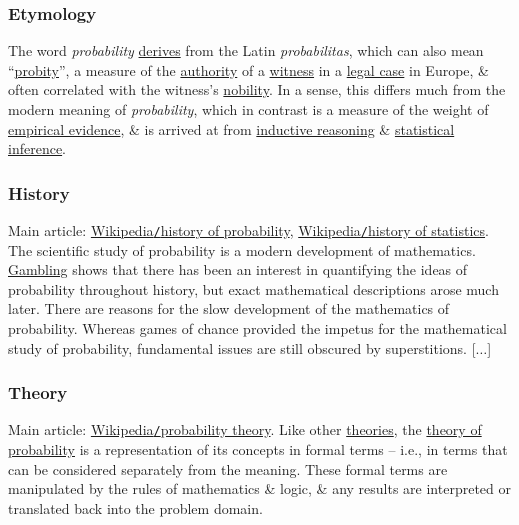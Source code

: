 \documentclass{article}
\begin{document}
\subsubsection{Etymology}
The word {\it probability} \href{https://en.wikipedia.org/wiki/Etymology}{derives} from the Latin {\it probabilitas}, which can also mean ``\href{https://en.wiktionary.org/wiki/probity}{probity}'', a measure of the \href{https://en.wikipedia.org/wiki/Authority}{authority} of a \href{https://en.wikipedia.org/wiki/Witness}{witness} in a \href{https://en.wikipedia.org/wiki/Legal_case}{legal case} in Europe, \& often correlated with the witness's \href{https://en.wikipedia.org/wiki/Nobility}{nobility}. In a sense, this differs much from the modern meaning of {\it probability}, which in contrast is a measure of the weight of \href{https://en.wikipedia.org/wiki/Empirical_evidence}{empirical evidence}, \& is arrived at from \href{https://en.wikipedia.org/wiki/Inductive_reasoning}{inductive reasoning} \& \href{https://en.wikipedia.org/wiki/Statistical_inference}{statistical inference}.

\subsubsection{History}
Main article: \href{https://en.wikipedia.org/wiki/History_of_probability}{Wikipedia{\tt/}history of probability}, \href{https://en.wikipedia.org/wiki/History_of_statistics}{Wikipedia{\tt/}history of statistics}. The scientific study of probability is a modern development of mathematics. \href{https://en.wikipedia.org/wiki/Gambling}{Gambling} shows that there has been an interest in quantifying the ideas of probability throughout history, but exact mathematical descriptions arose much later. There are reasons for the slow development of the mathematics of probability. Whereas games of chance provided the impetus for the mathematical study of probability, fundamental issues are still obscured by superstitions. [$\ldots$]

\subsubsection{Theory}
Main article: \href{https://en.wikipedia.org/wiki/Probability_theory}{Wikipedia{\tt/}probability theory}. Like other \href{https://en.wikipedia.org/wiki/Theory}{theories}, the \href{https://en.wikipedia.org/wiki/Probability_theory}{theory of probability} is a representation of its concepts in formal terms -- i.e., in terms that can be considered separately from the meaning. These formal terms are manipulated by the rules of mathematics \& logic, \& any results are interpreted or translated back into the problem domain.
\end{document}
